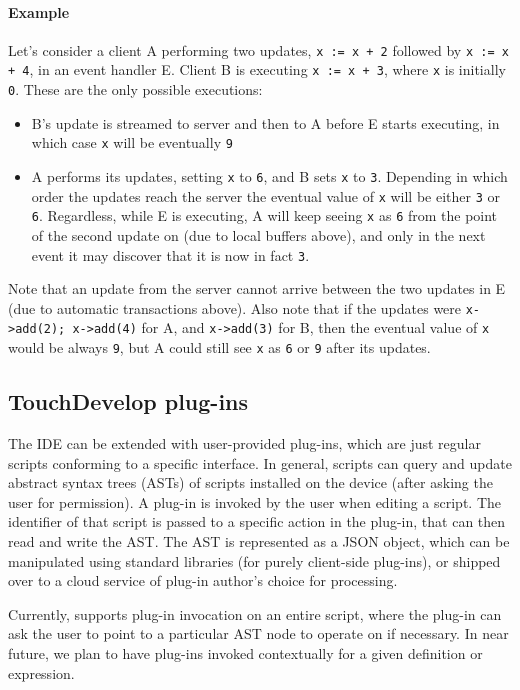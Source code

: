\documentclass[article]{sigplanconf}
\begin{document}
\paragraph{Example}
Let's consider a client A performing two updates, \texttt{x := x + 2} followed by \texttt{x := x + 4}, in an event handler E. Client
B is executing \texttt{x := x + 3}, where \texttt{x} is initially \texttt{0}.
These are the only possible executions:
\begin{itemize}
\item B's update is streamed to server and then to A before E starts executing,
in which case \texttt{x} will be eventually \texttt{9}
\item A performs its updates, setting \texttt{x} to \texttt{6}, and B sets
\texttt{x} to \texttt{3}. Depending in which order the updates reach the server
the eventual value of \texttt{x} will be either \texttt{3} or \texttt{6}.
Regardless, while E is executing, A will keep seeing \texttt{x} as \texttt{6}
from the point of the second update on
(due to local buffers above), and only in the next event it may discover that
it is now in fact \texttt{3}.
\end{itemize}
Note that an update from the server cannot arrive between the two updates in E (due to automatic transactions above).
Also note that if the updates were \texttt{x->add(2); x->add(4)} for A, and \texttt{x->add(3)} for B, then
the eventual value of \texttt{x} would be always \texttt{9}, but A could still see \texttt{x} as
\texttt{6} or \texttt{9} after its updates.

\subsection{TouchDevelop plug-ins}

The \TD IDE can be extended with user-provided plug-ins, which are just regular \TD scripts
conforming to a specific interface.
In general, \TD scripts can query and update abstract syntax trees (ASTs) of scripts installed
on the device (after asking the user for permission).
A plug-in is invoked by the user when editing a script.
The identifier of that script is passed to a specific action in the plug-in,
that can then read and write the AST.
The AST is represented as a JSON object, which can be manipulated using standard \TD libraries
(for purely client-side plug-ins),
or shipped over to a cloud service of plug-in author's choice for processing.

Currently, \TD supports plug-in invocation on an entire script, where the plug-in can ask the user
to point to a particular AST node to operate on if necessary.
In near future, we plan to have plug-ins invoked contextually for a given definition
or expression.
\end{document}
